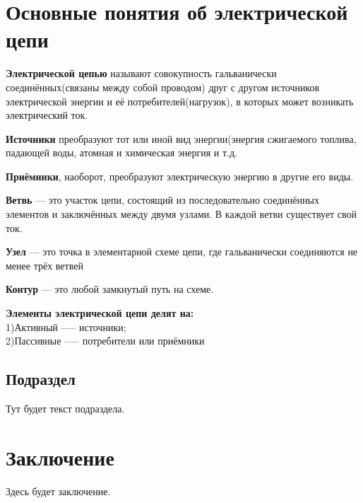 	\clearpage

	\section{Основные понятия об электрической цепи}
	
	
	\begin{definition}
		\textbf{Электрической цепью} называют совокупность гальванически соединённых(связаны между собой проводом) друг с другом источников электрической энергии и её потребителей(нагрузок), в которых может возникать электрический ток.
	\end{definition}
	
	\begin{definition}
		\textbf{Источники} преобразуют тот или иной вид энергии(энергия сжигаемого топлива, падающей воды, атомная и химическая энергия и т.д.
	\end{definition}
	
	\begin{definition}
		\textbf{Приёмники}, наоборот, преобразуют электрическую энергию в другие его виды.
	\end{definition}
	
	\begin{definition}
		\textbf{Ветвь} — это участок цепи, состоящий из последовательно соединённых элементов и заключённых между двумя узлами. В каждой ветви существует свой ток. 
	\end{definition}
	
	\begin{definition}
		\textbf{Узел} — это точка в элементарной схеме цепи, где гальванически соединяются не менее трёх ветвей 
	\end{definition}
	
	\begin{definition}
		\textbf{Контур} — это любой замкнутый путь на схеме. 
	\end{definition}
	
	\textbf{Элементы электрической цепи делят на:}\\
	1)Активный —-- источники;\\
	2)Пассивные —-- потребители или приёмники
	
	\clearpage
	
	\subsection{Подраздел}
	Тут будет текст подраздела.
	\clearpage
	\section{Заключение}
	Здесь будет заключение.
	
	
	
